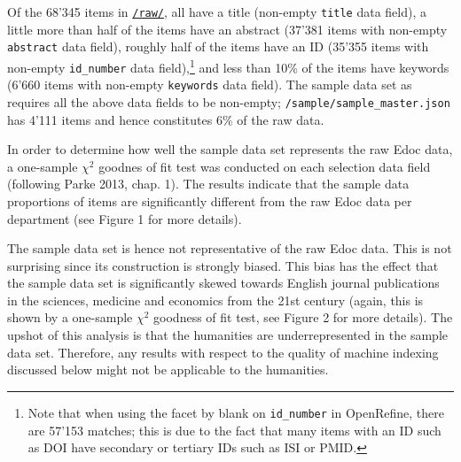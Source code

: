 Of the 68'345 items in
\href{https://github.com/MHindermann/mas/tree/main/files/raw}{\texttt{/raw/}},
all have a title (non-empty \texttt{title} data field), a little more
than half of the items have an abstract (37'381 items with non-empty
\texttt{abstract} data field), roughly half of the items have an ID
(35'355 items with non-empty \texttt{id\_number} data field),\footnote{Note
  that when using the facet by blank on \texttt{id\_number} in
  OpenRefine, there are 57'153 matches; this is due to the fact that
  many items with an ID such as DOI have secondary or tertiary IDs such
  as ISI or PMID.} and less than 10\% of the items have keywords (6'660
items with non-empty \texttt{keywords} data field). The sample data set
as requires all the above data fields to be non-empty;
\texttt{/sample/sample\_master.json} has 4'111 items and hence
constitutes 6\% of the raw data.

In order to determine how well the sample data set represents the raw
Edoc data, a one-sample \(\chi^2\) goodnes of fit test was conducted on
each selection data field (following Parke 2013, chap. 1). The results
indicate that the sample data proportions of items are significantly
different from the raw Edoc data per department (see Figure 1 for more
details).

The sample data set is hence not representative of the raw Edoc data.
This is not surprising since its construction is strongly biased. This
bias has the effect that the sample data set is significantly skewed
towards English journal publications in the sciences, medicine and
economics from the 21st century (again, this is shown by a one-sample
\(\chi^2\) goodness of fit test, see Figure 2 for more details). The
upshot of this analysis is that the humanities are underrepresented in
the sample data set. Therefore, any results with respect to the quality
of machine indexing discussed below might not be applicable to the
humanities.

